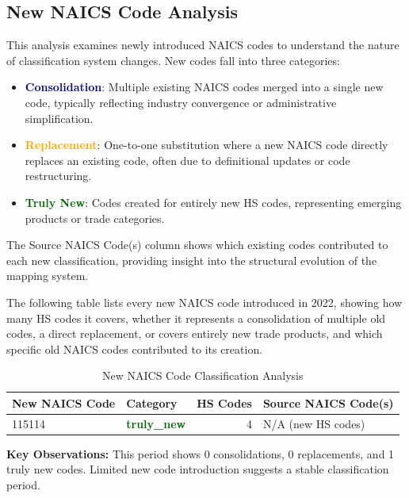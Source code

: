 \documentclass[11pt]{article}
\begin{document}
\subsection{New NAICS Code Analysis}

This analysis examines newly introduced NAICS codes to understand the nature of classification system changes. New codes fall into three categories:

\begin{itemize}
    \item \textcolor{darkblue}{\textbf{Consolidation}}: Multiple existing NAICS codes merged into a single new code, typically reflecting industry convergence or administrative simplification.
    \item \textcolor{orange}{\textbf{Replacement}}: One-to-one substitution where a new NAICS code directly replaces an existing code, often due to definitional updates or code restructuring.
    \item \textcolor{darkgreen}{\textbf{Truly New}}: Codes created for entirely new HS codes, representing emerging products or trade categories.
\end{itemize}

The Source NAICS Code(s) column shows which existing codes contributed to each new classification, providing insight into the structural evolution of the mapping system.

The following table lists every new NAICS code introduced in 2022, showing how many HS codes it covers, whether it represents a consolidation of multiple old codes, a direct replacement, or covers entirely new trade products, and which specific old NAICS codes contributed to its creation.

\begin{table}[H]
\centering
{}
\begin{tabular}{llrl}
\toprule
\textbf{New NAICS Code} & \textbf{Category} & \textbf{HS Codes} & \textbf{Source NAICS Code(s)} \\
\midrule
115114 & \textcolor{darkgreen}{\textbf{truly\_new}} & 4 & N/A (new HS codes) \\
\bottomrule
\end{tabular}
\caption{New NAICS Code Classification Analysis}
\end{table}

\textbf{Key Observations:} This period shows 0 consolidations, 0 replacements, and 1 truly new codes. Limited new code introduction suggests a stable classification period.
\end{document}
